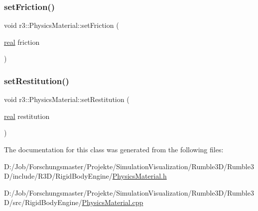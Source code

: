 \mbox{\label{classr3_1_1_physics_material_a8193e719476e1b22ba61b9cd15066437}} 
\subsubsection{\texorpdfstring{set\+Friction()}{setFriction()}}
{\footnotesize\ttfamily void r3\+::\+Physics\+Material\+::set\+Friction (\begin{DoxyParamCaption}\item[{\mbox{\hyperlink{namespacer3_ab2016b3e3f743fb735afce242f0dc1eb}{real}}}]{friction }\end{DoxyParamCaption})}

\mbox{\label{classr3_1_1_physics_material_a2056c195a2d655aefe9a480c28e67ddb}} 
\subsubsection{\texorpdfstring{set\+Restitution()}{setRestitution()}}
{\footnotesize\ttfamily void r3\+::\+Physics\+Material\+::set\+Restitution (\begin{DoxyParamCaption}\item[{\mbox{\hyperlink{namespacer3_ab2016b3e3f743fb735afce242f0dc1eb}{real}}}]{restitution }\end{DoxyParamCaption})}



The documentation for this class was generated from the following files\+:\begin{DoxyCompactItemize}
\item 
D\+:/\+Job/\+Forschungsmaster/\+Projekte/\+Simulation\+Visualization/\+Rumble3\+D/\+Rumble3\+D/include/\+R3\+D/\+Rigid\+Body\+Engine/\mbox{\hyperlink{_physics_material_8h}{Physics\+Material.\+h}}\item 
D\+:/\+Job/\+Forschungsmaster/\+Projekte/\+Simulation\+Visualization/\+Rumble3\+D/\+Rumble3\+D/src/\+Rigid\+Body\+Engine/\mbox{\hyperlink{_physics_material_8cpp}{Physics\+Material.\+cpp}}\end{DoxyCompactItemize}
